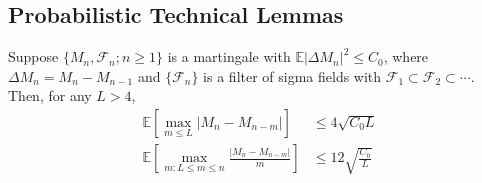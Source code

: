\subsection{Probabilistic Technical Lemmas}
\begin{lemma}\label{lem:mart-1}
	Suppose $\{M_n, \mathcal{F}_n; n \geq 1\}$ is a martingale with $\mathbb{E}|\Delta M_n|^2 \leq C_0$, where $\Delta M_n = M_n - M_{n-1}$ and $\{\mathcal{F}_n\}$ is a filter of sigma fields with $\mathcal{F}_1 \subset \mathcal{F}_2 \subset \cdots$. Then, for any $L > 4$,
	\begin{align}
		\mathbb{E} \left[ \max_{m \leq L} |M_n - M_{n - m}| \right] 
		&\leq 4\sqrt{C_0 L}\label{eq:A1}\\
		\mathbb{E} \left[ \max_{m : L \leq m \leq n} \frac{|M_n - M_{n - m}|}{m} \right] 
		&\leq 12 \sqrt{\frac{C_0}{L}} \label{eq:A2}
	\end{align}
\end{lemma}
